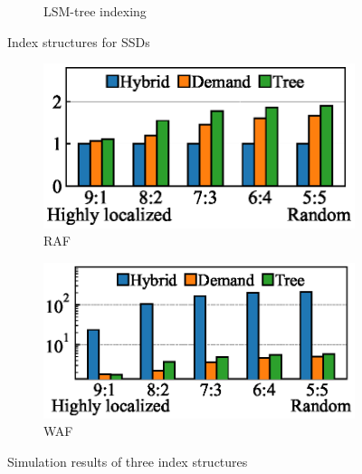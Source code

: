 \begin{figure}[t]
\begin{subfigure}[b]{0.32\textwidth}
         \caption{LSM-tree indexing}
         \label{fig:LSM-tree}
     \end{subfigure}
    \vspace{-5pt}
	 \caption{Index structures for SSDs}
    \vspace{-20pt}
    \label{fig:ftl-review}
\label{fig:back-idx}
\end{figure}





\begin{figure}[t]
     \centering
     \begin{subfigure}[b]{0.228\textwidth}
         \centering
         \includegraphics[width=\textwidth]{figs/OSDI/new-simul-raf.eps}
         \caption{RAF}
        \vspace{-10pt}
     \end{subfigure}
     \hfill
     \begin{subfigure}[b]{0.24\textwidth}
         \centering
         \includegraphics[width=\textwidth]{figs/OSDI/new-simul-waf.eps}
         \caption{WAF}
         \vspace{-10pt}
         \end{subfigure}
	 \caption{Simulation results of three index structures}
\label{fig:simul-result}
\end{figure}


